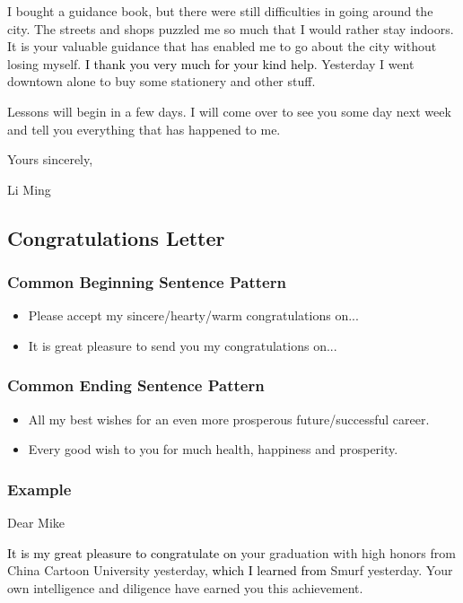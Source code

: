 \documentclass{article}
\begin{document}
\par I bought a guidance book, but there were still difficulties in going around the
city. The streets and shops puzzled me so much that I would rather stay indoors. It is
your valuable guidance that has enabled me to go about the city without losing
myself. \textcolor{black}{I thank you very much for your kind help}. Yesterday I went
downtown alone to buy some stationery and other stuff.

\par Lessons will begin in a few days. I will come over to see you some day next week and
tell you everything that has happened to me.

\hfill Yours sincerely,

\hfill Li Ming


\subsection{Congratulations Letter}
\label{sec:letter}

\subsubsection{Common Beginning Sentence Pattern}
\label{sec:comm-begnn-sent}
\begin{itemize}
\item Please accept my sincere/hearty/warm congratulations on...
\item It is great pleasure to send you my congratulations on...
\end{itemize}

\subsubsection{Common Ending Sentence Pattern}
\label{sec:comm-ending-sent-2}
\begin{itemize}
\item All my best wishes for an even more prosperous future/successful career.
\item Every good wish to you for much health, happiness and prosperity.
\end{itemize}

\subsubsection{Example}
\label{sec:example-2}
Dear Mike
\par \textcolor{black}{It is my great pleasure to congratulate on} your graduation with high
honors from China Cartoon University yesterday, \textcolor{black}{which I learned from}
Smurf yesterday. Your own intelligence and diligence have earned you this achievement.
\end{document}
